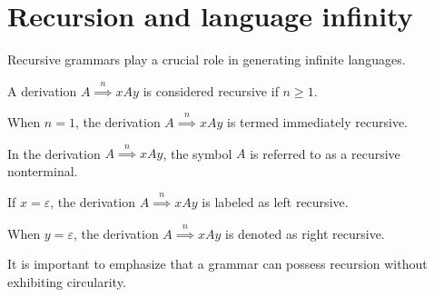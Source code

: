 \section{Recursion and language infinity}

Recursive grammars play a crucial role in generating infinite languages.
\begin{definition}
    A derivation $A\overset{n}{\implies}xAy$ is considered recursive if $n \geq 1$. 
\end{definition}
\begin{definition}
    When $n=1$, the derivation $A\overset{n}{\implies}xAy$ is termed immediately recursive.
\end{definition}
\begin{definition}
    In the derivation $A\overset{n}{\implies}xAy$, the symbol $A$ is referred to as a recursive nonterminal. 
\end{definition}
\begin{definition}
    If $x=\varepsilon$, the derivation $A\overset{n}{\implies}xAy$ is labeled as left recursive.
\end{definition}
\begin{definition}
    When $y=\varepsilon$, the derivation $A\overset{n}{\implies}xAy$ is denoted as right recursive.
\end{definition}
It is important to emphasize that a grammar can possess recursion without exhibiting circularity.

